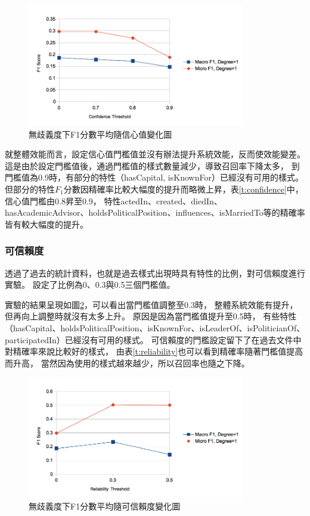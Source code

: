 \begin{figure}[h]
    \centering
    \includegraphics[width=0.85\textwidth]{images/04-conf-f1}
    \caption{無歧義度下F1分數平均隨信心值變化圖}
    \label{i:conf-f1}
\end{figure}

就整體效能而言，設定信心值門檻值並沒有辦法提升系統效能，反而使效能變差。
這是由於設定門檻值後，通過門檻值的樣式數量減少，導致召回率下降太多，
到門檻值為0.9時，有部分的特性（hasCapital, isKnownFor）已經沒有可用的樣式。
但部分的特性$F_1$分數因精確率比較大幅度的提升而略微上昇，表\ref{t:confidence}中，
信心值門檻由0.8昇至0.9，
特性actedIn、created、diedIn、hasAcademicAdvisor、holdsPoliticalPosition、influences、isMarriedTo等的精確率皆有較大幅度的提升。



\subsubsection{可信賴度}
透過了過去的統計資料，也就是過去樣式出現時具有特性的比例，對可信賴度進行實驗。
設定了比例為0、0.3與0.5三個門檻值。

實驗的結果呈現如圖\ref{i:reliability-f1}，可以看出當門檻值調整至0.3時，
整體系統效能有提升，但再向上調整時就沒有太多上升。
原因是因為當門檻值提升至0.5時，
有些特性（hasCapital、holdsPoliticalPosition、isKnownFor、isLeaderOf、isPoliticianOf、participatedIn）已經沒有可用的樣式。
可信賴度的門檻設定留下了在過去文件中對精確率來說比較好的樣式，
由表\ref{t:reliability}也可以看到精確率隨著門檻值提高而升高，
當然因為使用的樣式越來越少，所以召回率也隨之下降。

\begin{figure}[h]
    \centering
    \includegraphics[width=0.85\textwidth]{images/04-reliability-f1}
    \caption{無歧義度下F1分數平均隨可信賴度變化圖}
    \label{i:reliability-f1}
\end{figure}

